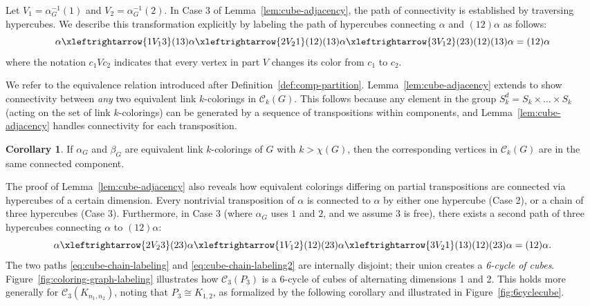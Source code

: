 \documentclass{amsart}
\theoremstyle{hypothesisstyle}
\theoremstyle{definition}
\newtheorem{corollary}[theorem]{Corollary}
\theoremstyle{remark}
\numberwithin{equation}{section}
\newcommand{\C}{\mathcal C}
\begin{document}
Let $V_1=\alpha_G^{-1}(1)$ and $V_2=\alpha_G^{-1}(2)$. In Case 3 of Lemma~\ref{lem:cube-adjacency}, the path of connectivity is established by traversing hypercubes. We describe this transformation explicitly by labeling the path of hypercubes connecting $\alpha$ and $(12)\alpha$ as follows:
\begin{equation}\label{eq:cube-chain-labeling}
\alpha \xleftrightarrow{1V_13}(13)\alpha \xleftrightarrow{2V_21} (12)(13)\alpha\xleftrightarrow{3V_12} (23)(12)(13)\alpha=(12)\alpha
\end{equation}
where the notation $c_1Vc_2$ indicates that every vertex in part $V$ changes its color from $c_1$ to $c_2$.

We refer to the equivalence relation introduced after Definition~\ref{def:comp-partition}.  Lemma~\ref{lem:cube-adjacency} extends to show connectivity between \emph{any} two equivalent link $k$-colorings in $\C_k(G)$. This follows because any element in the group $S_k^{d}=S_{k}\times \dots \times S_k$ (acting on the set of link $k$-colorings) can be generated by a sequence of transpositions within components, and Lemma~\ref{lem:cube-adjacency} handles connectivity for each transposition.

\begin{corollary}\label{cor:equivalent-links-connected}
    If $\alpha_G$ and $\beta_G$ are equivalent link $k$-colorings of $G$ with $k>\chi(G)$, then the corresponding vertices in $\C_k(G)$ are in the same connected component.
\end{corollary}

The proof of Lemma~\ref{lem:cube-adjacency} also reveals how equivalent colorings differing on partial transpositions are connected via hypercubes of a certain dimension. Every nontrivial transposition of $\alpha$ is connected to $\alpha$ by either one hypercube (Case 2), or a chain of three hypercubes (Case 3). Furthermore, in Case 3 (where $\alpha_G$ uses $1$ and $2$, and we assume $3$ is free), there exists a second path of three hypercubes connecting $\alpha$ to $(12)\alpha$:
\begin{equation}\label{eq:cube-chain-labeling2}
\alpha \xleftrightarrow{2V_23}(23)\alpha \xleftrightarrow{1V_12} (12)(23)\alpha\xleftrightarrow{3V_21} (13)(12)(23)\alpha=(12)\alpha.
\end{equation}
The two paths \eqref{eq:cube-chain-labeling} and \eqref{eq:cube-chain-labeling2} are internally disjoint; their union creates a \emph{6-cycle of cubes}. Figure~\ref{fig:coloring-graph-labeling} illustrates how $\C_3(P_3)$ is a 6-cycle of cubes of alternating dimensions 1 and 2. This holds more generally for $\C_3(K_{n_1,n_2})$, noting that $P_3\cong K_{1,2}$, as formalized by the following corollary and illustrated in Figure~\ref{fig:6cyclecube}.
\end{document}
